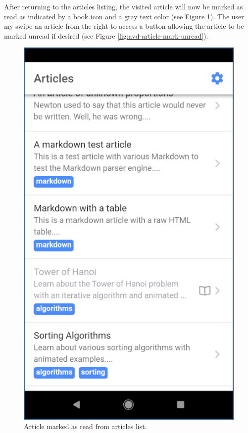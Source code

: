 \documentclass[12pt]{report}
\begin{document}
After returning to the articles listing, the visited article will now be marked
as read as indicated by a book icon and a gray text color (see Figure
\ref{fig:avd-article-read}). The user my swipe an article from the right to
access a button allowing the article to be marked unread if desired (see Figure
\ref{fig:avd-article-mark-unread}).

\begin{figure}
    \centering
    \includegraphics[scale=0.5]{images/avd-article-read.png}
    \caption{Article marked as read from articles list.}
    \label{fig:avd-article-read}
\end{figure}
\end{document}
